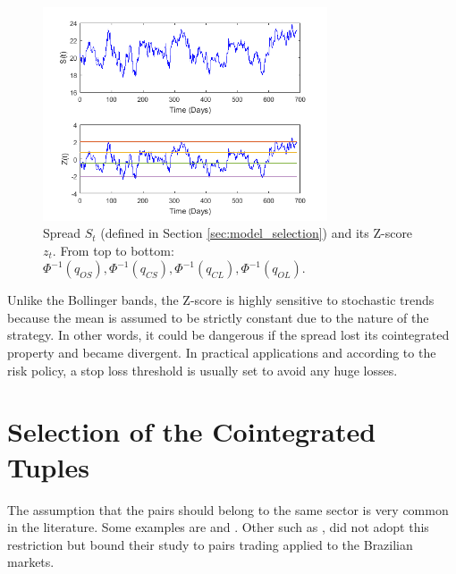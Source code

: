 \documentclass[11pt,a4,twosided,singlespacing,titlepagenumber=on]{scrreprt}
\numberwithin{equation}{chapter} %
\theoremstyle{remark}
\begin{document}
\begin{figure}[H]
\centering
\includegraphics[width = 0.75\textwidth]{zscore/zscore1}
\caption{Spread $S_t$ (defined in Section \ref{sec:model_selection}) and its Z-score $z_t$. From top to bottom: $\Phi^{-1}(q_{OS}), \Phi^{-1}(q_{CS}), \Phi^{-1}(q_{CL}), \Phi^{-1}(q_{OL})$.}
\label{zscore_graphical_strat}
\end{figure}

Unlike the Bollinger bands, the Z-score is highly sensitive to stochastic trends because the mean is assumed to be strictly constant due to the nature of the strategy. In other words, it could be dangerous if the spread lost its cointegrated property and became divergent. In practical applications and according to the risk policy, a stop loss threshold is usually set to avoid any huge losses.

\section{Selection of the Cointegrated Tuples}
The assumption that the pairs should belong to the same sector is very common in the literature. Some examples are \cite{chan2009} and \cite{dunis2010}. Other such as \cite{caldeira2013}, did not adopt this restriction but bound their study to pairs trading applied to the Brazilian markets. 
\end{document}
